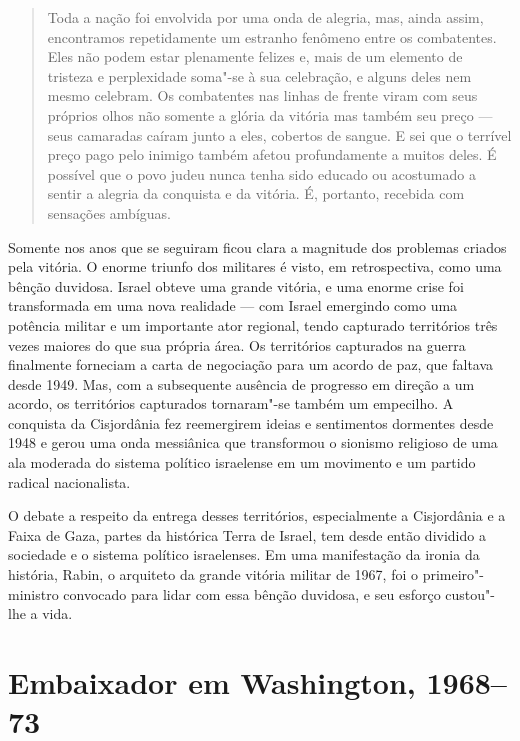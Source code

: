 \begin{quote}
Toda a nação foi envolvida por uma onda de alegria, mas, ainda assim,
encontramos repetidamente um estranho fenômeno entre os combatentes.
Eles não podem estar plenamente felizes e, mais de um elemento de
tristeza e perplexidade soma"-se à sua celebração, e alguns deles nem mesmo
celebram. Os combatentes nas linhas de frente viram com seus próprios
olhos não somente a glória da vitória mas também seu preço --- seus
camaradas caíram junto a eles, cobertos de sangue. E sei que o terrível
preço pago pelo inimigo também afetou profundamente a muitos deles. É
possível que o povo judeu nunca tenha sido educado ou acostumado a
sentir a alegria da conquista e da vitória. É, portanto, recebida com
sensações ambíguas.
\end{quote}

Somente nos anos que se seguiram ficou clara a magnitude dos problemas
criados pela vitória. O enorme triunfo dos militares é visto, em
retrospectiva, como uma bênção duvidosa. Israel obteve uma grande
vitória, e uma enorme crise foi transformada em uma nova realidade ---
com Israel emergindo como uma potência militar e um importante ator
regional, tendo capturado territórios três vezes maiores do que sua própria
área. Os territórios capturados na guerra finalmente forneciam a carta
de negociação para um acordo de paz, que faltava desde 1949. Mas, com a
subsequente ausência de progresso em direção a um acordo, os territórios
capturados tornaram"-se também um empecilho. A conquista da Cisjordânia
fez reemergirem ideias e sentimentos dormentes desde 1948 e gerou uma
onda messiânica que transformou o sionismo religioso de uma ala moderada
do sistema político israelense em um movimento e um partido radical
nacionalista.

O debate a respeito da entrega desses territórios, especialmente a
Cisjordânia e a Faixa de Gaza, partes da histórica Terra de Israel, tem
desde então dividido a sociedade e o sistema político israelenses. Em
uma manifestação da ironia da história, Rabin, o arquiteto da grande
vitória militar de 1967, foi o primeiro"-ministro convocado para lidar com
essa bênção duvidosa, e seu esforço custou"-lhe a vida.

\chapter[Embaixador em Washington, 1968--73]{Embaixador em Washington, 1968--73}

